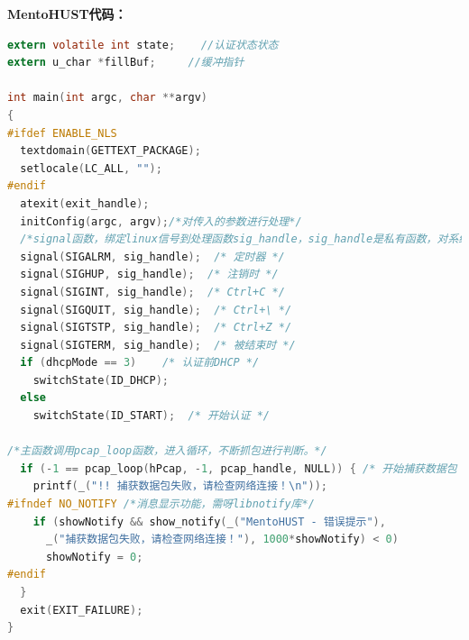 \documentclass{itecreport-zh}
\begin{document}
\textbf{MentoHUST代码：}
\begin{lstlisting}[language=C]
extern volatile int state;    //认证状态状态
extern u_char *fillBuf;     //缓冲指针

int main(int argc, char **argv)
{
#ifdef ENABLE_NLS
  textdomain(GETTEXT_PACKAGE);
  setlocale(LC_ALL, "");
#endif
  atexit(exit_handle);
  initConfig(argc, argv);/*对传入的参数进行处理*/
  /*signal函数，绑定linux信号到处理函数sig_handle，sig_handle是私有函数，对系统信号进行处理。*/
  signal(SIGALRM, sig_handle);  /* 定时器 */
  signal(SIGHUP, sig_handle);  /* 注销时 */
  signal(SIGINT, sig_handle);  /* Ctrl+C */
  signal(SIGQUIT, sig_handle);  /* Ctrl+\ */
  signal(SIGTSTP, sig_handle);  /* Ctrl+Z */
  signal(SIGTERM, sig_handle);  /* 被结束时 */
  if (dhcpMode == 3)    /* 认证前DHCP */
    switchState(ID_DHCP);
  else
    switchState(ID_START);  /* 开始认证 */

/*主函数调用pcap_loop函数，进入循环，不断抓包进行判断。*/
  if (-1 == pcap_loop(hPcap, -1, pcap_handle, NULL)) { /* 开始捕获数据包 */
    printf(_("!! 捕获数据包失败，请检查网络连接！\n"));
#ifndef NO_NOTIFY /*消息显示功能，需呀libnotify库*/
    if (showNotify && show_notify(_("MentoHUST - 错误提示"),
      _("捕获数据包失败，请检查网络连接！"), 1000*showNotify) < 0)
      showNotify = 0;
#endif
  }
  exit(EXIT_FAILURE);
}


\end{lstlisting}
\end{document}
